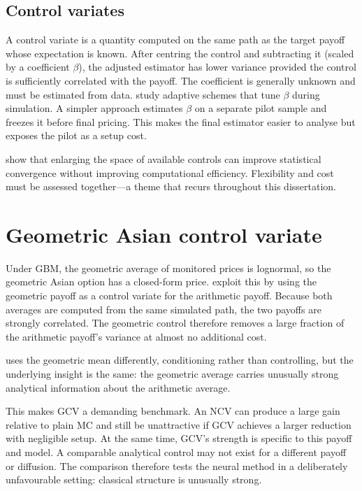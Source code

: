 \subsection{Control variates}

A control variate is a quantity computed on the same path as the target payoff whose expectation is known. After centring the control and subtracting it (scaled by a coefficient $\beta$), the adjusted estimator has lower variance provided the control is sufficiently correlated with the payoff. The coefficient is generally unknown and must be estimated from data. \textcite{kim_henderson_2004} study adaptive schemes that tune $\beta$ during simulation. A simpler approach estimates $\beta$ on a separate pilot sample and freezes it before final pricing. This makes the final estimator easier to analyse but exposes the pilot as a setup cost.

\textcite{portier_segers_2019} show that enlarging the space of available controls can improve statistical convergence without improving computational efficiency. Flexibility and cost must be assessed together---a theme that recurs throughout this dissertation.

\section{Geometric Asian control variate}

Under GBM, the geometric average of monitored prices is lognormal, so the geometric Asian option has a closed-form price. \textcite{kemna_vorst_1990} exploit this by using the geometric payoff as a control variate for the arithmetic payoff. Because both averages are computed from the same simulated path, the two payoffs are strongly correlated. The geometric control therefore removes a large fraction of the arithmetic payoff's variance at almost no additional cost.

\textcite{curran_1994} uses the geometric mean differently, conditioning rather than controlling, but the underlying insight is the same: the geometric average carries unusually strong analytical information about the arithmetic average.

This makes GCV a demanding benchmark. An NCV can produce a large gain relative to plain MC and still be unattractive if GCV achieves a larger reduction with negligible setup. At the same time, GCV's strength is specific to this payoff and model. A comparable analytical control may not exist for a different payoff or diffusion. The comparison therefore tests the neural method in a deliberately unfavourable setting: classical structure is unusually strong.

